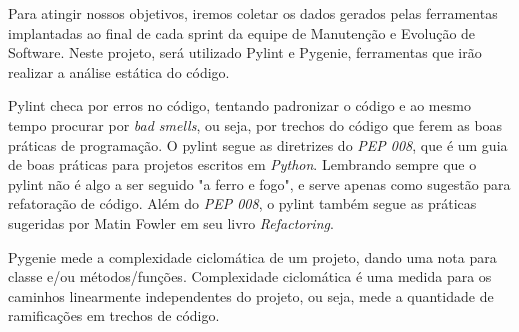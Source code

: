 

Para atingir nossos objetivos, iremos coletar os dados gerados pelas ferramentas
implantadas ao final de cada sprint da equipe de Manutenção e Evolução de Software.
Neste projeto, será utilizado Pylint e Pygenie, ferramentas que irão realizar a
análise estática do código.

Pylint checa por erros no código, tentando padronizar o código e ao mesmo tempo
procurar por \textit{bad smells}, ou seja, por trechos do código que ferem as boas
práticas de programação. O pylint segue as diretrizes do \textit{PEP 008}, que é
um guia de boas práticas para projetos escritos em \textit{Python}. Lembrando sempre
que o pylint não é algo a ser seguido "a ferro e fogo", e serve apenas como sugestão
para refatoração de código. Além do \textit{PEP 008}, o pylint também segue as
práticas sugeridas por Matin Fowler em seu livro \textit{Refactoring}.

Pygenie mede a complexidade ciclomática de um projeto, dando uma nota para classe
e/ou métodos/funções. Complexidade ciclomática é uma medida para os caminhos
linearmente independentes do projeto, ou seja, mede a quantidade de ramificações
em trechos de código.
